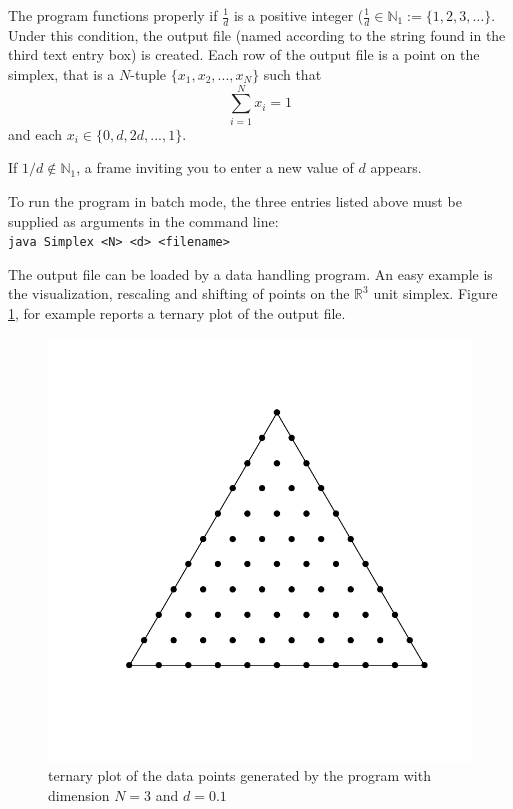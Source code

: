 \documentclass{jors}
\begin{document}
The program functions properly if $\frac{1}{d}$ is a positive integer ($\frac{1}{d} \in \mathbb{N}_1:=\{1,2,3,\dots \}$.
Under this condition, the output file (named according to the string found in the third text entry box) is created. Each row of the output file is a point on the simplex, that is a $N$-tuple $\{x_1,x_2,...,x_N\}$ such that
\[
\sum_{i=1}^N x_i=1
\]
and each $x_i \in \{0,d,2d,...,1\}$.

If $1/d  \notin \mathbb{N}_1$, a frame inviting you to enter a new value of $d$ appears.



To run the program in batch mode, the three entries listed above must be supplied as arguments in the command line:\\
\verb+java Simplex <N> <d> <filename>+

The output file can be loaded by a data handling program. 
An easy example is the visualization, rescaling and shifting of points on the $\mathbb{R}^3$ unit simplex.
Figure \ref{fig:ternary}, for example reports a ternary plot of the output file.

\begin{figure}[ht]
	\centering
	\includegraphics[scale=0.5]{fig1.pdf}
	\caption{ternary plot of the data points generated by the program with dimension $N=3$ and $d = 0.1$}
	\label{fig:ternary}
\end{figure}
\end{document}
